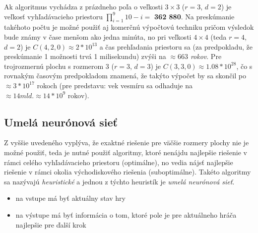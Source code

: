 Ak algoritmus vychádza z prázdneho poľa o veľkosti $3 \times 3$ ($r = 3$, $d = 2$) je veľkosť vyhľadávacieho priestoru
$\prod_{i = 1}^{9}{10 - i} =$ \textbf{362 880}.
Na preskúmanie takéhoto počtu je možné použiť aj komerčnú výpočtovú techniku pričom výsledok bude známy v čase menšom
ako jedna minúta, no pri veľkosti $4 \times 4$ (teda $r = 4$, $d = 2$) je $C(4, 2, 0) \approx 2*10^{13}$ a čas
prehľadania priestoru sa (za predpokladu, že preskúmanie 1 možnosti trvá 1 milisekundu) zvýši na
\emph{$\approx 663$ rokov}.
Pre trojrozmernú plochu s rozmerom $3$ ($r = 3$, $d = 3$) je $C(3, 3, 0) \approx 1.08 * 10^{28}$, čo s rovnakým časovým
predpokladom znamená, že takýto výpočet by sa skončil po $\approx 3*10^{17}$ rokoch (pre predstavu: vek vesmíru sa
odhaduje na $\approx 14 mld. \approx 14 * 10^9$ rokov).

\subsection{Umelá neurónová sieť}\label{subsec:algo-ann}

Z vyššie uvedeného vyplýva, že exaktné riešenie pre väčšie rozmery plochy nie je možné použiť, teda je nutné použiť
algoritmy, ktoré nenájdu najlepšie riešenie v rámci celého vyhľadávacieho priestoru (optimálne), no vedia nájsť
najlepšie riešenie v rámci okolia východiskového riešenia (suboptimálne).
Takéto algoritmy sa nazývajú \emph{heuristické} a jednou z týchto heuristík je \emph{umelá neurónová sieť}.

\begin{itemize}
    \item na vstupe má byť aktuálny stav hry
    \item na výstupe má byť informácia o tom, ktoré pole je pre aktuálneho hráča najlepšie pre ďalší krok
\end{itemize}

